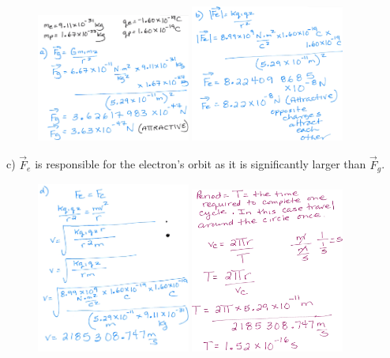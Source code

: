 \documentclass[a4paper,12pt]{article}
\begin{document}
\begin{figure}[H]
    \centering
    \includegraphics[width=0.45\textwidth]{longa}
    \includegraphics[width=0.45\textwidth]{longb}
\end{figure}
c) $\vec{F}_e$ is responsible for the electron's orbit as it is significantly larger than $\vec{F}_g$.
\begin{figure}[H]
    \centering
    \includegraphics[width=0.45\textwidth]{longd}
    \includegraphics[width=0.45\textwidth]{longe}
\end{figure}
\end{document}
